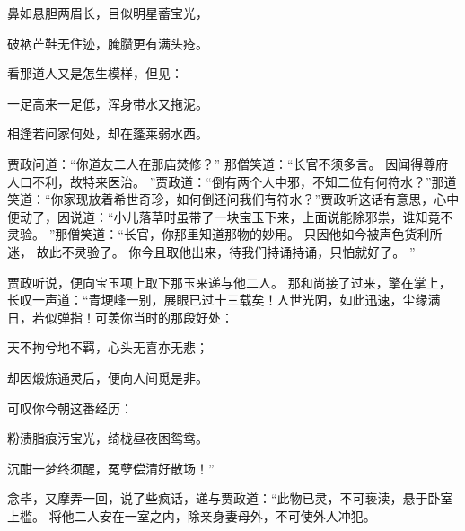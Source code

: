 \hop
鼻如悬胆两眉长，目似明星蓄宝光，\par
破衲芒鞋无住迹，腌臜更有满头疮。
\par
\hop
看那道人又是怎生模样，但见：\par
\hop
一足高来一足低，浑身带水又拖泥。
\par
相逢若问家何处，却在蓬莱弱水西。
\par
\hop
贾政问道：“你道友二人在那庙焚修？”
那僧笑道：“长官不须多言。
因闻得尊府人口不利，故特来医治。
”贾政道：“倒有两个人中邪，不知二位有何符水？”那道笑道：“你家现放着希世奇珍，如何倒还问我们有符水？”贾政听这话有意思，心中便动了，因说道：“小儿落草时虽带了一块宝玉下来，上面说能除邪祟，谁知竟不灵验。
”那僧笑道：“长官，你那里知道那物的妙用。
只因他如今被声色货利所迷，
故此不灵验了。
你今且取他出来，待我们持诵持诵，只怕就好了。
”\par
贾政听说，便向宝玉项上取下那玉来递与他二人。
那和尚接了过来，擎在掌上，长叹一声道：“青埂峰一别，展眼已过十三载矣！人世光阴，如此迅速，尘缘满日，若似弹指！可羡你当时的那段好处：\par
\hop
天不拘兮地不羁，心头无喜亦无悲；\par
却因煅炼通灵后，便向人间觅是非。
\par
\hop
可叹你今朝这番经历：\par
\hop
粉渍脂痕污宝光，绮栊昼夜困鸳鸯。
\par
沉酣一梦终须醒，冤孽偿清好散场！”\par
\hop
念毕，又摩弄一回，说了些疯话，递与贾政道：“此物已灵，不可亵渎，悬于卧室上槛。
将他二人安在一室之内，除亲身妻母外，不可使外人冲犯。

